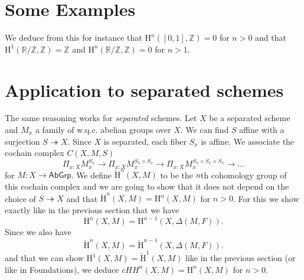\documentclass[10pt,a4paper]{article}
\newcommand\HH{\mathrm{H}}
\newcommand\cHH{\check{\mathrm{H}}}
\newcommand{\ints}{\mathbb{Z}}
\newcommand{\reals}{\mathbb{R}}
\newcommand{\Ab}{\mathsf{AbGrp}}
\newcommand{\ras}{\twoheadrightarrow}
\begin{document}
 \section{Some Examples}

 We deduce from this for instance that $\HH^n([0,1],\ints) = 0$ for $n>0$
 and that $\HH^1(\reals/\ints, \ints) = \ints$
 and $\HH^n(\reals/\ints, \ints) = 0$  for $n>1$.

 \section{Application to separated schemes}

 The same reasoning works for {\em separated} schemes. Let $X$ be a separated scheme and $M_x$ a family
 of w.q.c. abelian groups over $X$. We can find $S$ affine with a surjection $S\ras X$. Since
 $X$ is separated, each fiber $S_x$ is affine.
We associate the
cochain complex $C(X,M,S)$
\[
\Pi_{x:X}M_x^{S_x}\rightarrow \Pi_{x:X}M_x^{S_x\times S_x}\rightarrow \Pi_{x:X}M_x^{S_x\times S_x\times S_x}\rightarrow \dots
\]
for $M:X\rightarrow\Ab$. We define $\cHH^n(X,M)$ to be the $n$th cohomology group of this cochain complex
and we are going to show that it does not depend on the choice of $S\ras X$ and that
$\cHH^n(X,M) = \HH^n(X,M)$ for $n>0$. For this we show exactly like in the previous section that we have
\[
\HH^n(X,M) = \HH^{n-1}(X,\Delta(M,F)).
\]
Since we also have
\[
\cHH^n(X,M) = \cHH^{n-1}(X,\Delta(M,F)).
\]
and that we can show $\HH^1(X,M) = \cHH^1(X,M)$ like in the previous section (or like in Foundations),
we deduce $cHH^n(X,M) = \HH^n(X,M)$ for $n>0$.
\end{document}
